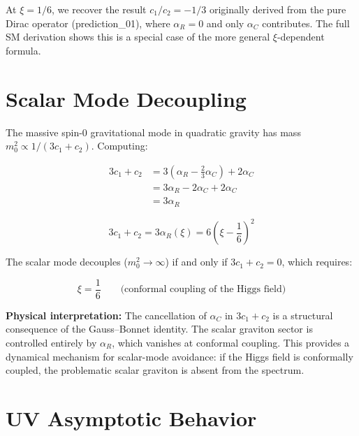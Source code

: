 \documentclass[11pt,a4paper]{article}
\begin{document}
At $\xi = 1/6$, we recover the result $c_1/c_2 = -1/3$ originally derived
from the pure Dirac operator (prediction\_01), where $\alpha_R = 0$ and only
$\alpha_C$ contributes. The full SM derivation shows this is a special case
of the more general $\xi$-dependent formula.

\section{Scalar Mode Decoupling}

The massive spin-0 gravitational mode in quadratic gravity has mass
$m_0^2 \propto 1/(3c_1 + c_2)$. Computing:

\begin{align}
  3c_1 + c_2 &= 3\!\left(\alpha_R - \frac{2}{3}\alpha_C\right) + 2\alpha_C \nonumber \\
  &= 3\alpha_R - 2\alpha_C + 2\alpha_C \nonumber \\
  &= 3\alpha_R
\end{align}

\begin{equation}
  \boxed{3c_1 + c_2 = 3\alpha_R(\xi) = 6\!\left(\xi - \frac{1}{6}\right)^{\!2}}
  \label{eq:scalar-mode}
\end{equation}

The scalar mode decouples ($m_0^2 \to \infty$) if and only if
$3c_1 + c_2 = 0$, which requires:

\begin{equation}
  \xi = \frac{1}{6} \qquad \text{(conformal coupling of the Higgs field)}
\end{equation}

\textbf{Physical interpretation:} The cancellation of $\alpha_C$ in $3c_1 + c_2$
is a structural consequence of the Gauss--Bonnet identity. The scalar graviton
sector is controlled entirely by $\alpha_R$, which vanishes at conformal coupling.
This provides a dynamical mechanism for scalar-mode avoidance: if the Higgs
field is conformally coupled, the problematic scalar graviton is absent from
the spectrum.

\section{UV Asymptotic Behavior}
\end{document}
